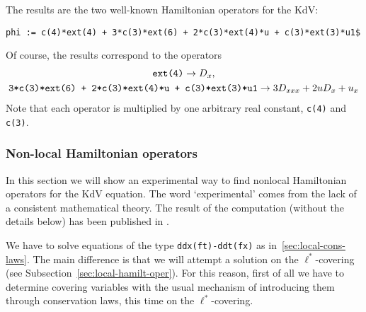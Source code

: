 The results are the two well-known Hamiltonian operators for the KdV:
\begin{verbatim}
phi := c(4)*ext(4) + 3*c(3)*ext(6) + 2*c(3)*ext(4)*u + c(3)*ext(3)*u1$
\end{verbatim}
Of course, the results correspond to the operators
\begin{gather*}
  \text{\texttt{ext(4)}} \to D_x,\\
  \text{\texttt{3*c(3)*ext(6) +
  2*c(3)*ext(4)*u + c(3)*ext(3)*u1}} \to 3D_{xxx} + 2uD_{x} + u_x
\end{gather*}
Note that each operator is multiplied by one arbitrary real
constant, \texttt{c(4)} and \texttt{c(3)}.

\subsubsection{Non-local Hamiltonian operators}
\label{sec:non-local-hamilt}

In this section we will show an experimental way to find nonlocal Hamiltonian
operators for the KdV equation. The word `experimental' comes from the lack of
a consistent mathematical theory. The result of the computation (without the
details below) has been published in \cite{KKV}.

We have to solve equations of the type \texttt{ddx(ft)-ddt(fx)} as
in~\ref{sec:local-cons-laws}. The main difference is that we will attempt a
solution on the $\ell^*$-covering (see Subsection~\ref{sec:local-hamilt-oper}).
For this reason, first of all we have to determine covering variables with the
usual mechanism of introducing them through conservation laws, this time on the
$\ell^*$-covering.

